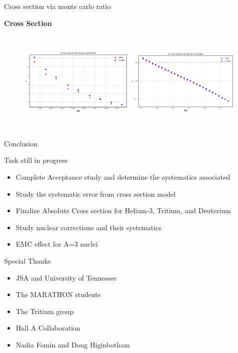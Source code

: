 \documentclass{beamer}
\begin{document}
\begin{frame}{Cross section via monte carlo ratio}
\begin{block}{\textbf{Cross Section}}
	\begin{figure}
		\hspace*{-0.5cm}\includegraphics[height=5cm,width=5.50cm]{../images/H_final.pdf}			\hspace*{0.5cm}\includegraphics[height=5cm,width=5.50cm]{../images/H3_final.pdf}
	\end{figure}
\end{block}
\end{frame}



\begin{frame}{Conclusion}
	\begin{block}{Task still in progress}
		\begin{itemize}
			\item Complete Acceptance study and determine the systematics associated
			\item Study the systematic error from cross section model
			\item Finalize Absolute Cross section for Helium-3, Tritium, and Deuterium 
			\item Study nuclear corrections and their systematics
			\item EMC effect for A=3 nuclei
		\end{itemize}
	\end{block}	
	\begin{block}{Special Thanks}
	\begin{itemize}
		\item JSA and University of Tennessee
		\item The MARATHON students
		\item The Tritium group 
		\item Hall A Collaboration
		\item Nadia Fomin and Doug Higinbotham
	\end{itemize}
\end{block}
\end{frame}
	
	
\end{document}
